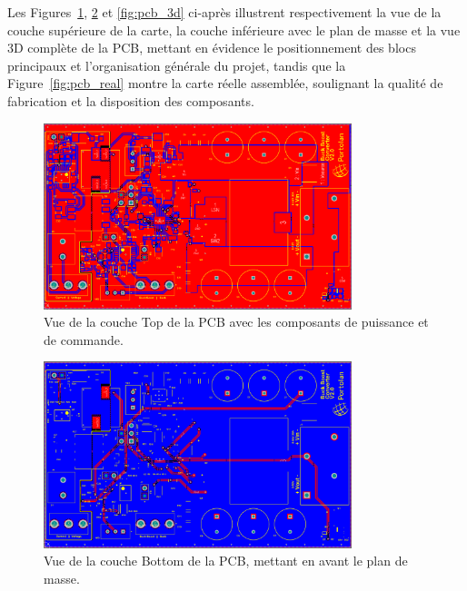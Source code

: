 Les Figures~\ref{fig:pcb_top}, \ref{fig:pcb_bottom} et \ref{fig:pcb_3d} ci-après illustrent respectivement la vue de la couche supérieure de la carte, la couche inférieure avec le plan de masse et la vue 3D complète de la PCB, mettant en évidence le positionnement des blocs principaux et l'organisation générale du projet, tandis que la Figure~\ref{fig:pcb_real} montre la carte réelle assemblée, soulignant la qualité de fabrication et la disposition des composants.

\begin{figure}[H]
    \centering
    \includegraphics[width=0.8\textwidth]{figures/PCB_Top.png}
    \caption{Vue de la couche Top de la PCB avec les composants de puissance et de commande.}
    \label{fig:pcb_top}
\end{figure}

\begin{figure}[H]
    \centering
    \includegraphics[width=0.8\textwidth]{figures/PCB_Bottom.png}
    \caption{Vue de la couche Bottom de la PCB, mettant en avant le plan de masse.}
    \label{fig:pcb_bottom}
\end{figure}

